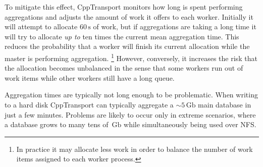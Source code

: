 \documentclass[11pt,a4paper]{article}
\newcommand{\packagefont}{\sffamily}
\newcommand{\CppTransport}{{\packagefont CppTransport}}
\newcommand{\SQLite}{{\packagefont SQLite}}
\newcommand{\Gb}{\,\mathrm{Gb}}
\newcommand{\second}{\,\mathrm{s}}
\newcommand{\semibold}[1]{{\fontseries{b}\selectfont{#1}}}
\begin{document}
\begin{itemize}
    To mitigate this effect, {\CppTransport} monitors how long is spent
    performing aggregations and adjusts the amount of work it offers
    to each worker.
    Initially it will attempt to allocate $60\second$ of work,
    but if aggregations are taking a long time
    it will try to allocate \emph{up to}
    ten times the current mean aggregation time.
    This reduces the probability that a worker will finish its current
    allocation while the master is performing aggregation.%
        \footnote{In practice it may allocate less work in order to balance the
        number of work items assigned to each worker process.}
    However, conversely, it increases the risk that the allocation becomes unbalanced
    in the sense that some workers run out of work items while other workers
    still have a long queue.

    \semibold{Alternative strategies.}
    Aggregation times are typically not long enough to be problematic.
    When writing to a hard disk {\CppTransport} can typically aggregate a $\sim 5 \Gb$
    main database in just a few minutes.
    Problems are likely to occur only in extreme scenarios, where a database grows to
    many tens of $\Gb$ while simultaneously being used over NFS.

    
    
    

\end{itemize}
\end{document}
